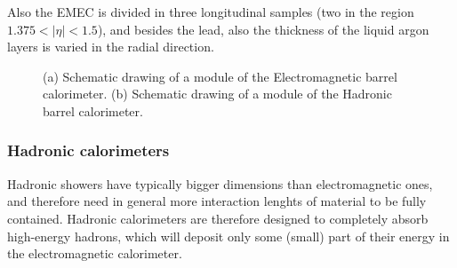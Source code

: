 Also the EMEC is divided in three longitudinal samples (two in the region $1.375<|\eta|<1.5$),
and besides the lead, also the thickness of the liquid argon layers is varied in the
radial direction.

\begin{figure}[tb]\begin{center}
	\caption{(a) Schematic drawing of a module of the Electromagnetic barrel calorimeter. 
        (b) Schematic drawing of a module of the Hadronic barrel calorimeter.}
\end{center}\end{figure}



\subsubsection{Hadronic calorimeters}\label{sec:hadcal}

Hadronic showers have typically bigger dimensions than
electromagnetic ones, and therefore need in general more
interaction lenghts of material to be fully contained.
Hadronic calorimeters are therefore designed to completely
absorb high-energy hadrons, which will deposit only some (small) part of their energy 
in the electromagnetic calorimeter.



